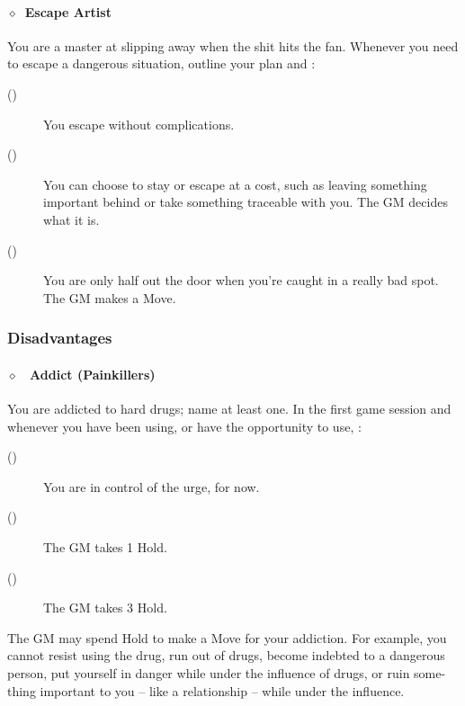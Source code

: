 \paragraph{\(\diamond\)~Escape Artist}%
You are a master at slipping away when the shit hits the fan. Whenever you need to escape a
dangerous situation, outline your plan and :
\begin{description}
 \item[()] You escape without complications.
 \item[()] You can choose to stay or escape at a cost, such as leaving something
                          important behind or take something traceable with you. The GM decides
                          what it is.
 \item[()] You are only half out the door when you’re caught in a really bad spot. The
                       GM makes a Move.
\end{description}
\KULTrule%

\subsubsection{Disadvantages}%
\label{ssub:criminal_disadvantages}

\paragraph{\(\diamond\)~ Addict (Painkillers)}%
You are addicted to hard drugs; name at least one. In the first game session and whenever you have
been using, or have the opportunity to use, :
\begin{description}
 \item[()] You are in control of the urge, for now.
 \item[()] The GM takes 1 Hold.
 \item[()] The GM takes 3 Hold.
\end{description}
The GM may spend Hold to make a Move for your addiction. For example, you cannot resist using the
drug, run out of drugs, become indebted to a dangerous person, put yourself in danger while under
the influence of drugs, or ruin some-thing important to you – like a relationship – while under
the influence.
\KULTrule%

